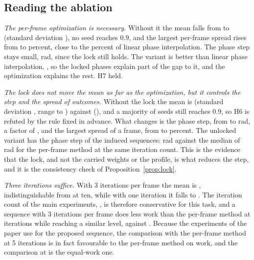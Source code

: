 \subsection{Reading the ablation}

\emph{The per-frame optimization is necessary.} Without it the mean falls from \ablTFullMean{} to \ablTNoOptMean{} (standard deviation \ablTNoOptSd{}), no seed reaches $0.9$, and the largest per-frame spread rises from \ablTFullSig{} to \ablTNoOptSig{} percent, close to the \accLpiSigmaMed{} percent of linear phase interpolation. The phase step stays small, \ablTNoOptStep{} rad, since the lock still holds. The variant is better than linear phase interpolation, \accLpiTransMean{}, so the locked phases explain part of the gap to it, and the optimization explains the rest. H7 held.

\emph{The lock does not move the mean as far as the optimization, but it controls the step and the spread of outcomes.} Without the lock the mean is \ablTNoLockMean{} (standard deviation \ablTNoLockSd{}, range \ablTNoLockMin{} to \ablTNoLockMax{}) against \ablTFullMean{} (\ablTFullSd{}), and a majority of seeds still reaches $0.9$, so H6 is refuted by the rule fixed in advance. What changes is the phase step, from \ablTFullStep{} to \ablTNoLockStep{} rad, a factor of \lockStepRatio{}, and the largest spread of a frame, from \ablTFullSig{} to \ablTNoLockSig{} percent. The unlocked variant has the phase step of the induced sequences: \ablTNoLockStep{} rad against the median of \accKimTenStepMed{} rad for the per-frame method at the same iteration count. This is the evidence that the lock, and not the carried weights or the profile, is what reduces the step, and it is the consistency check of Proposition~\ref{prop:lock}.

\emph{Three iterations suffice.} With 3 iterations per frame the mean is \ablTItersThreeMean{}, indistinguishable from \ablTFullMean{} at ten, while with one iteration it falls to \ablTItersOneMean{}. The iteration count of the main experiments, \parFrameIters{}, is therefore conservative for this task, and a sequence with 3 iterations per frame does less work than the per-frame method at \parKimIters{} iterations while reaching a similar level, \ablTItersThreeMean{} against \accKimFiveTransMean{}. Because the experiments of the paper use \parFrameIters{} for the proposed sequence, the comparison with the per-frame method at 5 iterations is in fact favourable to the per-frame method on work, and the comparison at \parFrameIters{} is the equal-work one.

